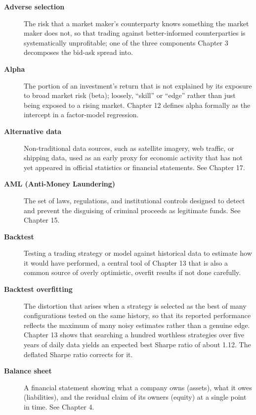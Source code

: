 \documentclass[../ai_in_finance]{subfiles}
\begin{document}
\begin{description}

\item[\textbf{Adverse selection}] The risk that a market maker's counterparty knows something the market maker does not, so that trading against better-informed counterparties is systematically unprofitable; one of the three components Chapter 3 decomposes the bid-ask spread into.

\item[\textbf{Alpha}] The portion of an investment's return that is not explained by its exposure to broad market risk (beta); loosely, ``skill'' or ``edge'' rather than just being exposed to a rising market. Chapter 12 defines alpha formally as the intercept in a factor-model regression.

\item[\textbf{Alternative data}] Non-traditional data sources, such as satellite imagery, web traffic, or shipping data, used as an early proxy for economic activity that has not yet appeared in official statistics or financial statements. See Chapter 17.

\item[\textbf{AML (Anti-Money Laundering)}] The set of laws, regulations, and institutional controls designed to detect and prevent the disguising of criminal proceeds as legitimate funds. See Chapter 15.

\item[\textbf{Backtest}] Testing a trading strategy or model against historical data to estimate how it would have performed, a central tool of Chapter 13 that is also a common source of overly optimistic, overfit results if not done carefully.

\item[\textbf{Backtest overfitting}] The distortion that arises when a strategy is selected as the best of many configurations tested on the same history, so that its reported performance reflects the maximum of many noisy estimates rather than a genuine edge. Chapter 13 shows that searching a hundred worthless strategies over five years of daily data yields an expected best Sharpe ratio of about 1.12. The deflated Sharpe ratio corrects for it.

\item[\textbf{Balance sheet}] A financial statement showing what a company owns (assets), what it owes (liabilities), and the residual claim of its owners (equity) at a single point in time. See Chapter 4.


\end{description}
\end{document}
